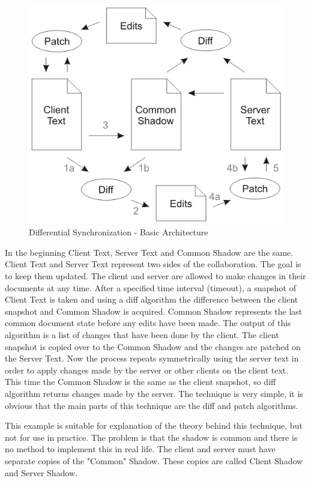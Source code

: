 \documentclass[12pt,oneside]{fithesis2}
\begin{document}
 \begin{figure}[H]
\caption{Differential Synchronization - Basic Architecture \cite{Fraser}}
\label{fig:ds1}
\centering
\vspace{5mm}
\includegraphics{diff1}
\end{figure}
\par In the beginning Client Text, Server Text and Common Shadow are the same. Client Text and Server Text represent two sides of the collaboration. The goal is to keep them updated. The client and server are allowed to make changes in their documents at any time.
After a specified time interval (timeout), a snapshot of Client Text is taken and using a diff algorithm the difference between the client snapshot and Common Shadow is acquired. Common Shadow represents the last common document state before any edits have been made. The output of this algorithm is a list of changes that have been done by the client. The client snapshot is copied over to the Common Shadow and the changes are patched on the Server Text. Now the process repeats symmetrically using the server text in order to apply changes made by the server or other clients on the client text. This time the Common Shadow is the same as the client snapshot, so diff algorithm returns changes made by the server. The technique is very simple, it is obvious that the main parts of this technique are the diff and patch algorithms.
\par This example is suitable for explanation of the theory behind this technique, but not for use in practice. The problem is that the shadow is common and there is no method to implement this in real life. The client and server must have separate copies of the "Common" Shadow. These copies are called Client Shadow and Server Shadow.
\end{document}
